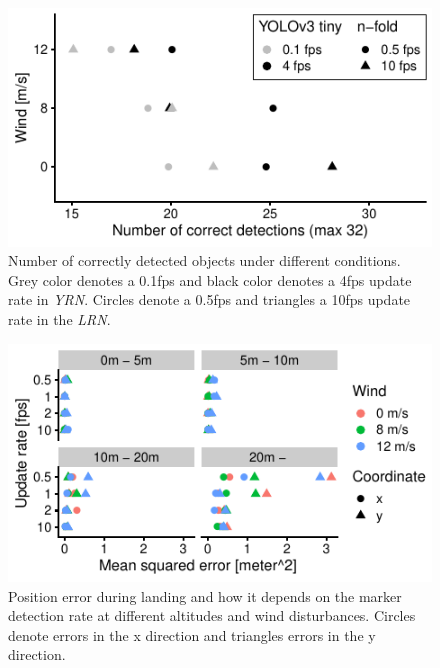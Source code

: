 \documentclass[conference]{IEEEtran}
\begin{document}
\begin{figure}[t]
  \centering
  \includegraphics{data_visualization/QoSDetection.pdf}
  \caption{Number of correctly detected objects
  under different conditions. 
  Grey color denotes a 0.1fps and black color denotes a 4fps 
  update rate in \emph{YRN}. 
  Circles denote a 0.5fps and triangles a 10fps update 
  rate in the \emph{LRN}.}
  \label{fig:NCorrectObjectDetections}
\end{figure}


\begin{figure}[t]
\centering
\includegraphics{data_visualization/QoSLanding.pdf}
\caption{Position error during landing and how it depends 
on the marker detection rate at different altitudes and wind disturbances.
Circles denote errors in the x direction and triangles 
errors in the y direction.}
\label{fig:PositionErrorDuringLanding}
\end{figure}
\end{document}
